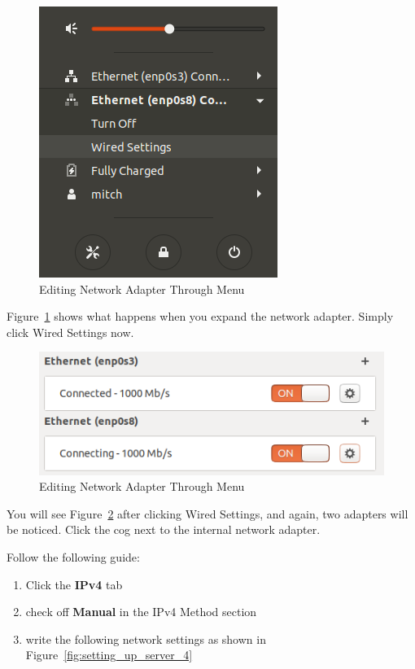 \documentclass[12pt]{article}
\begin{document}
    \begin{figure}[H]
        \begin{center}
            \includegraphics[scale=0.5]{setting_up_server_2.png}
        \end{center}{}
        \caption{Editing Network Adapter Through Menu}
        \label{fig:setting_up_server_2}
    \end{figure}

    Figure~\ref{fig:setting_up_server_2} shows what happens when you expand the network adapter. Simply click Wired Settings now.
    
    \begin{figure}[H]
        \begin{center}
            \includegraphics[scale=0.5]{setting_up_server_3.png}
        \end{center}{}
        \caption{Editing Network Adapter Through Menu}
        \label{fig:setting_up_server_3}
    \end{figure}

    You will see Figure~\ref{fig:setting_up_server_3} after clicking Wired Settings, and again, two adapters will be noticed. Click the cog next to the internal network adapter.

    Follow the following guide:
    \begin{enumerate}
        \item Click the \textbf{IPv4} tab
        \item check off \textbf{Manual} in the IPv4 Method section
        \item write the following network settings as shown in Figure~\ref{fig:setting_up_server_4}
    \end{enumerate}
\end{document}

